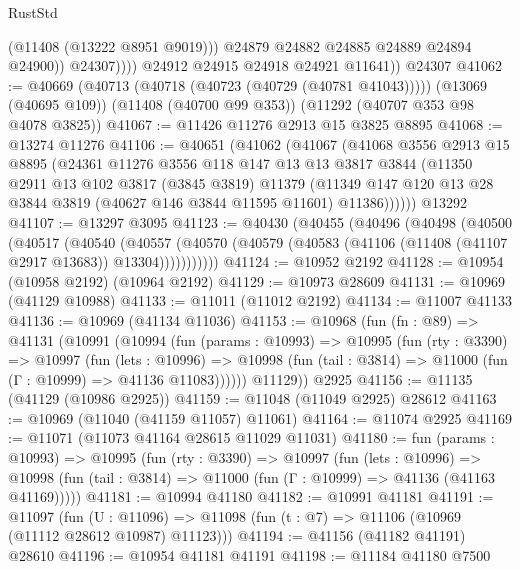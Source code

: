 \begin{lexlean}{RustStd}
\begin{coremodule}
                      (@11408 (@13222 @8951 @9019)))
                    @24879
                    @24882
                    @24885
                    @24889
                    @24894
                    @24900))
                @24307))))
        @24912
        @24915
        @24918
        @24921
        @11641))
    @24307
@41062 := @40669
    (@40713 (@40718 (@40723 (@40729 (@40781 @41043)))))
    (@13069 (@40695 @109))
    (@11408 (@40700 @99 @353))
    (@11292 (@40707 @353 @98 @4078 @3825))
@41067 := @11426 @11276 @2913 @15 @3825 @8895
@41068 := @13274 @11276
@41106 := @40651
    (@41062
      (@41067
        (@41068
          @3556
          @2913
          @15
          @8895
          (@24361
            @11276
            @3556
            @118
            @147
            @13
            @13
            @3817
            @3844
            (@11350
              @2911
              @13
              @102
              @3817
              (@3845 @3819)
              @11379
              (@11349 @147 @120 @13 @28 @3844 @3819 (@40627 @146 @3844 @11595 @11601) @11386))))))
    @13292
@41107 := @13297 @3095
@41123 := @40430
    (@40455
      (@40496
        (@40498
          (@40500
            (@40517
              (@40540
                (@40557
                  (@40570 (@40579 (@40583 (@41106 (@11408 (@41107 @2917 @13683)) @13304)))))))))))
@41124 := @10952 @2192
@41128 := @10954 (@10958 @2192) (@10964 @2192)
@41129 := @10973 @28609
@41131 := @10969 (@41129 @10988)
@41133 := @11011 (@11012 @2192)
@41134 := @11007 @41133
@41136 := @10969 (@41134 @11036)
@41153 := @10968
    (fun (fn : @89) =>
    @41131
      (@10991
        (@10994
          (fun (params : @10993) =>
          @10995
            (fun (rty : @3390) =>
            @10997
              (fun (lets : @10996) =>
              @10998 (fun (tail : @3814) => @11000 (fun (Γ : @10999) => @41136 @11083))))))
        @11129))
    @2925
@41156 := @11135 (@41129 (@10986 @2925))
@41159 := @11048 (@11049 @2925) @28612
@41163 := @10969 (@11040 (@41159 @11057) @11061)
@41164 := @11074 @2925
@41169 := @11071 (@11073 @41164 @28615 @11029 @11031)
@41180 := fun (params : @10993) =>
  @10995
    (fun (rty : @3390) =>
    @10997
      (fun (lets : @10996) =>
      @10998 (fun (tail : @3814) => @11000 (fun (Γ : @10999) => @41136 (@41163 @41169)))))
@41181 := @10994 @41180
@41182 := @10991 @41181
@41191 := @11097
    (fun (U : @11096) => @11098 (fun (t : @7) => @11106 (@10969 (@11112 @28612 @10987) @11123)))
@41194 := @41156 (@41182 @41191) @28610
@41196 := @10954 @41181 @41191
@41198 := @11184 @41180 @7500

\end{coremodule}
\end{lexlean}
